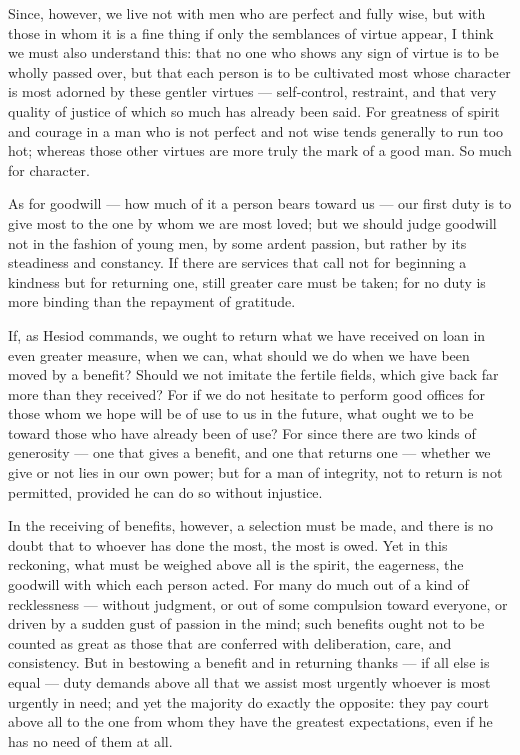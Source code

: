  Since, however, we live not with men who are perfect and fully wise, but with those in whom it is a fine thing if only the semblances of virtue appear, I think we must also understand this: that no one who shows any sign of virtue is to be wholly passed over, but that each person is to be cultivated most whose character is most adorned by these gentler virtues — self-control, restraint, and that very quality of justice of which so much has already been said. For greatness of spirit and courage in a man who is not perfect and not wise tends generally to run too hot; whereas those other virtues are more truly the mark of a good man. So much for character.

 As for goodwill — how much of it a person bears toward us — our first duty is to give most to the one by whom we are most loved; but we should judge goodwill not in the fashion of young men, by some ardent passion, but rather by its steadiness and constancy. If there are services that call not for beginning a kindness but for returning one, still greater care must be taken; for no duty is more binding than the repayment of gratitude.

 If, as Hesiod commands, we ought to return what we have received on loan in even greater measure, when we can, what should we do when we have been moved by a benefit? Should we not imitate the fertile fields, which give back far more than they received? For if we do not hesitate to perform good offices for those whom we hope will be of use to us in the future, what ought we to be toward those who have already been of use? For since there are two kinds of generosity — one that gives a benefit, and one that returns one — whether we give or not lies in our own power; but for a man of integrity, not to return is not permitted, provided he can do so without injustice.

 In the receiving of benefits, however, a selection must be made, and there is no doubt that to whoever has done the most, the most is owed. Yet in this reckoning, what must be weighed above all is the spirit, the eagerness, the goodwill with which each person acted. For many do much out of a kind of recklessness — without judgment, or out of some compulsion toward everyone, or driven by a sudden gust of passion in the mind; such benefits ought not to be counted as great as those that are conferred with deliberation, care, and consistency. But in bestowing a benefit and in returning thanks — if all else is equal — duty demands above all that we assist most urgently whoever is most urgently in need; and yet the majority do exactly the opposite: they pay court above all to the one from whom they have the greatest expectations, even if he has no need of them at all.

